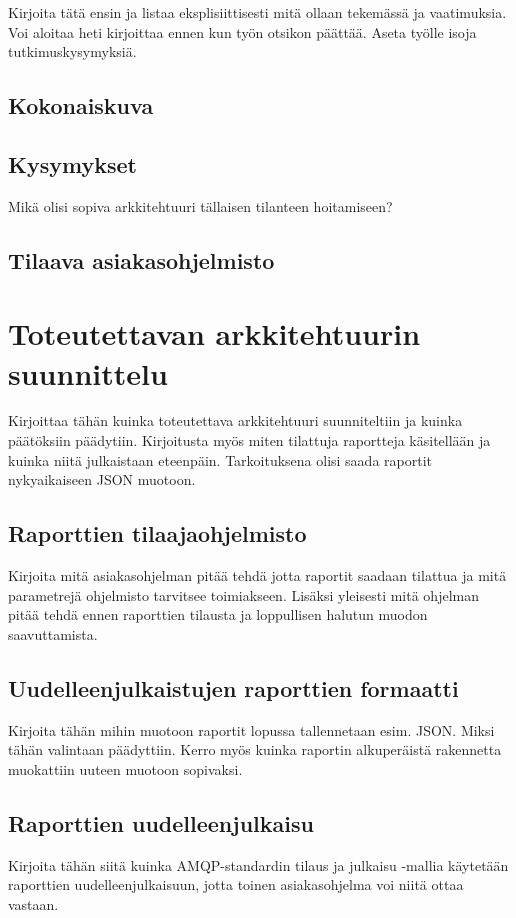 \documentclass[globalnumbering,centeredcaptions,draftfooter]{tutthesis} %
\begin{document}
Kirjoita tätä ensin ja listaa eksplisiittisesti mitä ollaan tekemässä ja vaatimuksia. Voi aloitaa heti kirjoittaa ennen kun työn otsikon päättää. Aseta työlle isoja tutkimuskysymyksiä.
\section{Kokonaiskuva}
\section{Kysymykset}
Mikä olisi sopiva arkkitehtuuri tällaisen tilanteen hoitamiseen?

\section{Tilaava asiakasohjelmisto}


\chapter{Toteutettavan arkkitehtuurin suunnittelu}
\label{ch:toteutettavan arkkitehtuurin suunnittelu}
Kirjoittaa tähän kuinka toteutettava arkkitehtuuri suunniteltiin ja kuinka päätöksiin päädytiin. Kirjoitusta myös miten tilattuja raportteja käsitellään ja kuinka niitä julkaistaan eteenpäin. Tarkoituksena olisi saada raportit nykyaikaiseen JSON muotoon.

\section{Raporttien tilaajaohjelmisto}
Kirjoita mitä asiakasohjelman pitää tehdä jotta raportit saadaan tilattua ja mitä parametrejä ohjelmisto tarvitsee toimiakseen. Lisäksi yleisesti mitä ohjelman pitää tehdä ennen raporttien tilausta ja loppullisen halutun muodon saavuttamista.

\section{Uudelleenjulkaistujen raporttien formaatti}
Kirjoita tähän mihin muotoon raportit lopussa tallennetaan esim. JSON. Miksi tähän valintaan päädyttiin. Kerro myös kuinka raportin alkuperäistä rakennetta muokattiin uuteen muotoon sopivaksi.

\section{Raporttien uudelleenjulkaisu}
Kirjoita tähän siitä kuinka AMQP-standardin tilaus ja julkaisu -mallia käytetään raporttien uudelleenjulkaisuun, jotta toinen asiakasohjelma voi niitä ottaa vastaan.
\end{document}
